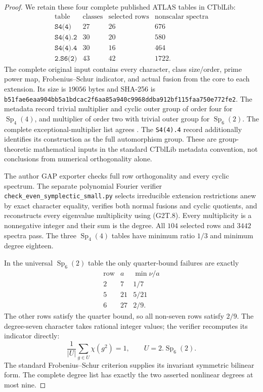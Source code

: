 \begin{proof}
We retain these four complete published ATLAS tables in CTblLib:
\[
\begin{array}{c|r|r|r}
\text{table}&\text{classes}&\text{selected rows}&
\text{nonscalar spectra}\\\hline
\texttt{S4(4)}&27&26&676\\
\texttt{S4(4).2}&30&20&580\\
\texttt{S4(4).4}&30&16&464\\
\texttt{2.S6(2)}&43&42&1722.
\end{array}                                                   \tag{ESC.5}
\]
The complete original input contains every character, class
size/order, prime power map, Frobenius--Schur indicator, and
actual fusion from the core to each extension.  Its size is
$19056$ bytes and SHA-256 is
\texttt{b51fae6eaa904bb5a1bdcac2f6aa85a940c9968ddba912bf115faa750e772fe2}.
The metadata record trivial multiplier and cyclic outer group
of order four for $\operatorname{Sp}_4(4)$, and multiplier
of order two with trivial outer group for
$\operatorname{Sp}_6(2)$.  The complete exceptional-multiplier
list agrees \cite[Chapter~5, Table~1, p.~35]{BI:HHM}.
The \texttt{S4(4).4} record additionally identifies its
construction as the full automorphism group.  These are
group-theoretic mathematical inputs in the standard CTblLib
metadata convention, not conclusions from numerical
orthogonality alone.

The author GAP exporter checks full row orthogonality and
every cyclic spectrum.  The separate polynomial Fourier
verifier \texttt{check\_even\_symplectic\_small.py} selects
irreducible extension restrictions anew by exact character
equality, verifies both normal fusions and cyclic quotients,
and reconstructs every eigenvalue multiplicity using (G2T.8).
Every multiplicity is a nonnegative integer and their sum
is the degree.  All $104$ selected rows and $3442$ spectra
pass.  The three $\operatorname{Sp}_4(4)$ tables have minimum
ratio $1/3$ and minimum degree eighteen.

In the universal $\operatorname{Sp}_6(2)$ table the only
quarter-bound failures are exactly
\[
\begin{array}{r|r|c}
\text{row}&a&\min\nu/a\\\hline
2&7&1/7\\
5&21&5/21\\
6&27&2/9.
\end{array}                                                   \tag{ESC.6}
\]
The other rows satisfy the quarter bound, so all non-seven
rows satisfy $2/9$.  The degree-seven character takes rational
integer values; the verifier recomputes its indicator directly:
\[
             \frac1{|U|}\sum_{g\in U}\chi(g^2)=1,
                     \qquad U=2.\operatorname{Sp}_6(2).
\]
The standard Frobenius--Schur criterion supplies its invariant
symmetric bilinear form.  The complete degree list has exactly
the two asserted nonlinear degrees at most nine.


\end{proof}
